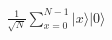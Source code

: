 \documentclass[preview]{standalone}
\begin{document}
\begin{align*}
\frac{1}{\sqrt{N}} \sum_{x=0}^{N-1} |x\rangle |0\rangle
\end{align*}
\end{document}
